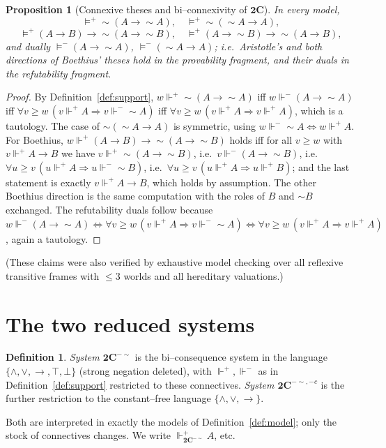 \documentclass{amsart}
\theoremstyle{plain}
\newtheorem{proposition}[theorem]{Proposition}
\theoremstyle{definition}
\newtheorem{definition}[theorem]{Definition}
\newcommand{\To}{\rightarrow}
\newcommand{\bigC}{\mathbf{2C}}
\newcommand{\Ci}{\mathbf{2C}^{-{\sim}}}        %
\newcommand{\Cii}{\mathbf{2C}^{-{\sim},-c}}    %
\newcommand{\fp}{\Vdash^{+}}
\newcommand{\fm}{\Vdash^{-}}
\begin{document}
\begin{proposition}[Connexive theses and bi--connexivity of $\bigC$]\label{prop:base}
In every model,
\[
\models^{+}{\sim}(A\To{\sim}A),\quad
\models^{+}{\sim}({\sim}A\To A),
\]
\[
\models^{+}(A\To B)\To{\sim}(A\To{\sim}B),\quad
\models^{+}(A\To{\sim}B)\To{\sim}(A\To B),
\]
and dually $\models^{-}(A\To{\sim}A)$, $\models^{-}({\sim}A\To A)$;
i.e.\ Aristotle's and both directions of Boethius' theses hold in the
provability fragment, and their duals in the refutability fragment.
\end{proposition}
\begin{proof}
By Definition~\ref{def:support}, $w\fp{\sim}(A\To{\sim}A)$ iff $w\fm (A\To{\sim}A)$
iff $\forall v\ge w\,(v\fp A\Rightarrow v\fm{\sim}A)$ iff $\forall v\ge
w\,(v\fp A\Rightarrow v\fp A)$, which is a tautology. The case of
${\sim}({\sim}A\To A)$ is symmetric, using $w\fm{\sim}A\iff w\fp A$.
For Boethius, $w\fp(A\To B)\To{\sim}(A\To{\sim}B)$ holds iff for all $v\ge w$
with $v\fp A\To B$ we have $v\fp{\sim}(A\To{\sim}B)$, i.e.\ $v\fm(A\To{\sim}B)$,
i.e.\ $\forall u\ge v\,(u\fp A\Rightarrow u\fm{\sim}B)$, i.e.\
$\forall u\ge v\,(u\fp A\Rightarrow u\fp B)$; and the last statement is exactly
$v\fp A\To B$, which holds by assumption. The other Boethius direction is the
same computation with the roles of $B$ and ${\sim}B$ exchanged. The refutability
duals follow because $w\fm(A\To{\sim}A)\iff\forall v\ge w\,(v\fp A\Rightarrow
v\fm{\sim}A)\iff\forall v\ge w\,(v\fp A\Rightarrow v\fp A)$, again a tautology.
\end{proof}

(These claims were also verified by exhaustive model checking over all reflexive
transitive frames with $\le 3$ worlds and all hereditary valuations.)

\section{The two reduced systems}\label{sec:systems}

\begin{definition}\label{def:reduced}
\emph{System $\Ci$} is the bi--consequence system in the language
$\{\wedge,\vee,\To,\top,\bot\}$ (strong negation deleted), with $\fp,\fm$ as in
Definition~\ref{def:support} restricted to these connectives. \emph{System
$\Cii$} is the further restriction to the constant--free language
$\{\wedge,\vee,\To\}$.
\end{definition}

Both are interpreted in exactly the models of Definition~\ref{def:model}; only
the stock of connectives changes. We write $\Vdash_{\Ci}^{+}A$, etc.
\end{document}
